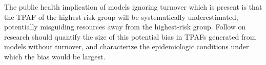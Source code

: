 The public health implication of models ignoring turnover which is present
is that the TPAF of the highest-risk group will be systematically underestimated,
potentially misguiding resources away from the highest-risk group.
Follow on research should quantify the size of
this potential bias in TPAFs generated from models without turnover,
and characterize the epidemiologic conditions under which the bias would be largest.
